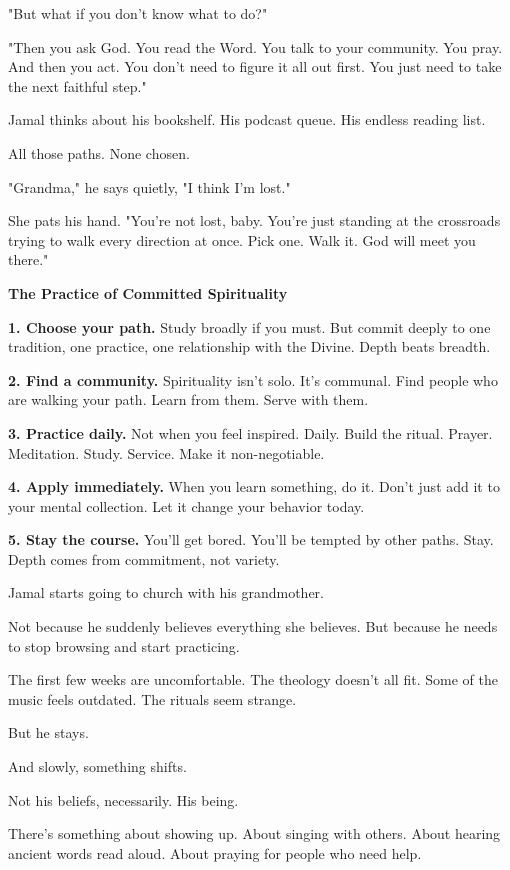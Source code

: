 \documentclass[11pt,twoside]{book}
\begin{document}
"But what if you don't know what to do?"

"Then you ask God. You read the Word. You talk to your community. You pray. And then you act. You don't need to figure it all out first. You just need to take the next faithful step."

Jamal thinks about his bookshelf. His podcast queue. His endless reading list.

All those paths. None chosen.

"Grandma," he says quietly, "I think I'm lost."

She pats his hand. "You're not lost, baby. You're just standing at the crossroads trying to walk every direction at once. Pick one. Walk it. God will meet you there."

\begin{practicebox}
\textbf{The Practice of Committed Spirituality}

\textbf{1. Choose your path.} Study broadly if you must. But commit deeply to one tradition, one practice, one relationship with the Divine. Depth beats breadth.

\textbf{2. Find a community.} Spirituality isn't solo. It's communal. Find people who are walking your path. Learn from them. Serve with them.

\textbf{3. Practice daily.} Not when you feel inspired. Daily. Build the ritual. Prayer. Meditation. Study. Service. Make it non-negotiable.

\textbf{4. Apply immediately.} When you learn something, do it. Don't just add it to your mental collection. Let it change your behavior today.

\textbf{5. Stay the course.} You'll get bored. You'll be tempted by other paths. Stay. Depth comes from commitment, not variety.
\end{practicebox}

Jamal starts going to church with his grandmother.

Not because he suddenly believes everything she believes. But because he needs to stop browsing and start practicing.

The first few weeks are uncomfortable. The theology doesn't all fit. Some of the music feels outdated. The rituals seem strange.

But he stays.

And slowly, something shifts.

Not his beliefs, necessarily. His being.

There's something about showing up. About singing with others. About hearing ancient words read aloud. About praying for people who need help.
\end{document}
